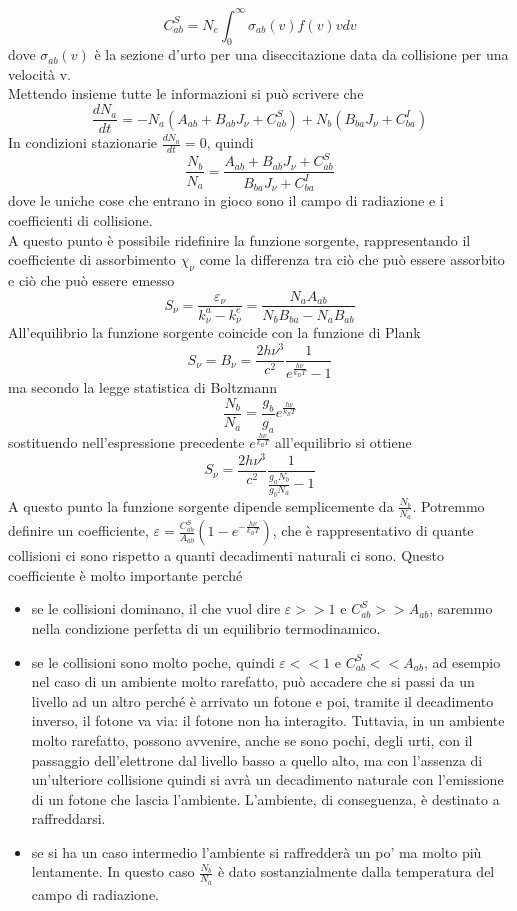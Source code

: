 \documentclass[a4paper,11pt]{article}
\renewcommand{\epsilon}{\varepsilon}
\begin{document}
\[C_{ab}^S=N_e\int_{0}^{\infty}\sigma_{ab}(v)f(v)vdv\] dove \(\sigma_{ab}(v)\) è la sezione d'urto per una diseccitazione data da collisione per una velocità v. \\ Mettendo insieme tutte le informazioni si può scrivere che 
\[\frac{dN_a}{dt}= -N_a (A_{ab}+B_{ab}J_\nu +C_{ab}^S)+N_b(B_{ba}J_\nu+C_{ba}^I)\]
In condizioni stazionarie \(\frac{dN_a}{dt}=0\), quindi 
\[\frac{N_b}{N_a}=\frac{A_{ab}+B_{ab}J_\nu +C_{ab}^S}{B_{ba}J_\nu+C_{ba}^I}\]
dove le uniche cose che entrano in gioco sono il campo di radiazione e i coefficienti di collisione. \\
A questo punto è possibile ridefinire la funzione sorgente, rappresentando il coefficiente di assorbimento \(\chi_\nu\) come la differenza tra ciò che può essere assorbito e ciò che può essere emesso
\[S_\nu= \frac{\epsilon_\nu}{k_\nu ^a - k_\nu ^e}=\frac{N_a A_{ab}}{N_b B_{ba}- N_a B_{ab}}\]
All'equilibrio la funzione sorgente coincide con la funzione di Plank
\[S_\nu = B_\nu = \frac{2h\nu ^3}{c^2}\frac{1}{e^{\frac{h\nu}{k_B T}}-1}\]
ma secondo la legge statistica di Boltzmann 
\[\frac{N_b}{N_a}=\frac{g_b}{g_a}e^{\frac{h\nu}{k_BT}}\]
sostituendo nell'espressione precedente \(e^{\frac{h\nu}{k_B T}}\) all'equilibrio si ottiene 
\[S_\nu = \frac{2h\nu ^3}{c^2}\frac{1}{\frac{g_a N_b}{g_b N_a}-1}\]
A questo punto la funzione sorgente dipende semplicemente da \(\frac{N_b}{N_a}\). Potremmo definire un coefficiente, \(\epsilon=\frac{C_{ab}^S}{A_{ab}} (1-e^{-\frac{h\nu}{k_B T}})\), che è rappresentativo di quante collisioni ci sono rispetto a quanti decadimenti naturali ci sono. Questo coefficiente è molto importante perché 
\begin{itemize}
\item se le collisioni dominano, il che vuol dire \(\epsilon >> 1\) e \(C_{ab}^S >> A_{ab}\), saremmo nella condizione perfetta di un equilibrio termodinamico.  \item se le collisioni sono molto poche, quindi \(\epsilon << 1\) e \(C_{ab}^S << A_{ab}\), ad esempio nel caso di un ambiente molto rarefatto, può accadere che si passi da un livello ad un altro perché è arrivato un fotone e poi, tramite il decadimento inverso, il fotone va via: il fotone non ha interagito. Tuttavia, in un ambiente molto rarefatto, possono avvenire, anche se sono pochi, degli urti, con il passaggio dell'elettrone dal livello basso a quello alto, ma con l'assenza di un'ulteriore collisione quindi si avrà un decadimento naturale con l'emissione di un fotone che lascia l'ambiente. L'ambiente, di conseguenza, è destinato a raffreddarsi. 
\item se si ha un caso intermedio l'ambiente si raffredderà un po' ma molto più lentamente. In questo caso \(\frac{N_b}{N_a}\) è dato sostanzialmente dalla temperatura del campo di radiazione. 
\end{itemize}
\end{document}
